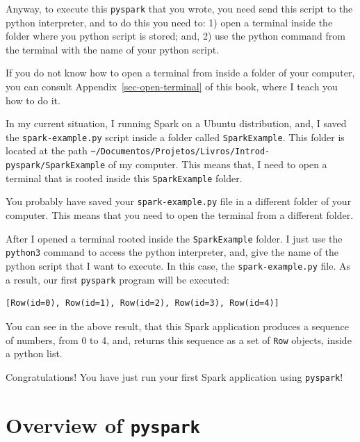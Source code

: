 \documentclass[
  11pt,
  letterpaper,
  DIV=11,
  numbers=noendperiod]{scrreprt}
\newenvironment{Shaded}{\begin{snugshade}}{\end{snugshade}}
\newcommand{\NormalTok}[1]{\textcolor[rgb]{0.00,0.23,0.31}{#1}}
\begin{document}
Anyway, to execute this \texttt{pyspark} that you wrote, you need send
this script to the python interpreter, and to do this you need to: 1)
open a terminal inside the folder where you python script is stored;
and, 2) use the python command from the terminal with the name of your
python script.

If you do not know how to open a terminal from inside a folder of your
computer, you can consult Appendix~\ref{sec-open-terminal} of this book,
where I teach you how to do it.

In my current situation, I running Spark on a Ubuntu distribution, and,
I saved the \texttt{spark-example.py} script inside a folder called
\texttt{SparkExample}. This folder is located at the path
\texttt{\textasciitilde{}/Documentos/Projetos/Livros/Introd-pyspark/SparkExample}
of my computer. This means that, I need to open a terminal that is
rooted inside this \texttt{SparkExample} folder.

You probably have saved your \texttt{spark-example.py} file in a
different folder of your computer. This means that you need to open the
terminal from a different folder.

After I opened a terminal rooted inside the \texttt{SparkExample}
folder. I just use the \texttt{python3} command to access the python
interpreter, and, give the name of the python script that I want to
execute. In this case, the \texttt{spark-example.py} file. As a result,
our first \texttt{pyspark} program will be executed:

\begin{Shaded}
\end{Shaded}

\begin{verbatim}
[Row(id=0), Row(id=1), Row(id=2), Row(id=3), Row(id=4)]
\end{verbatim}

You can see in the above result, that this Spark application produces a
sequence of numbers, from 0 to 4, and, returns this sequence as a set of
\texttt{Row} objects, inside a python list.

Congratulations! You have just run your first Spark application using
\texttt{pyspark}!

\hypertarget{overview-of-pyspark}{%
\section{\texorpdfstring{Overview of
\texttt{pyspark}}{Overview of pyspark}}\label{overview-of-pyspark}}
\end{document}
